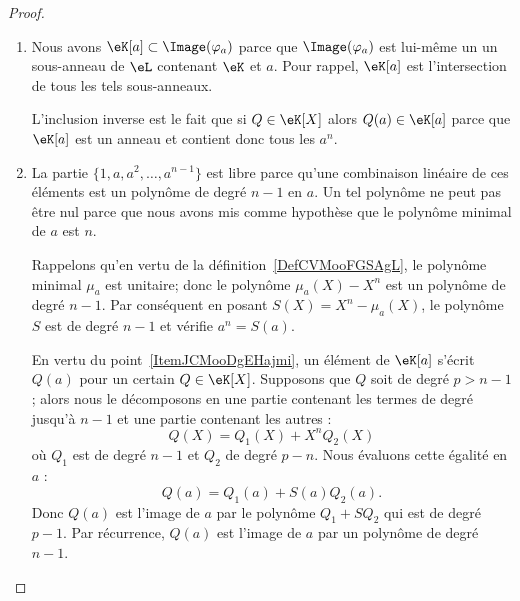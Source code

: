 \begin{proof}
    \begin{enumerate}
        \item
            Nous avons \( \eK[a]\subset \Image(\varphi_a)\) parce que \( \Image(\varphi_a)\) est lui-même un un sous-anneau de \( \eL\) contenant \( \eK\) et \( a\). Pour rappel, \( \eK[a]\) est l'intersection de tous les tels sous-anneaux.

            L'inclusion inverse est le fait que si \( Q\in \eK[X]\) alors \( Q(a)\in \eK[a]\) parce que \( \eK[a]\) est un anneau et contient donc tous les \( a^n\).
        \item
            La partie \( \{ 1,a,a^2,\ldots, a^{n-1} \}\) est libre parce qu'une combinaison linéaire de ces éléments est un polynôme de degré \( n-1\) en \( a\). Un tel polynôme ne peut pas être nul parce que nous avons mis comme hypothèse que le polynôme minimal de \( a\) est \( n\).

            Rappelons qu'en vertu de la définition~\ref{DefCVMooFGSAgL}, le polynôme minimal \( \mu_a\) est unitaire; donc le polynôme \( \mu_a(X)-X^n\) est un polynôme de degré \( n-1\). Par conséquent en posant \( S(X)=X^n-\mu_a(X)\), le polynôme \( S\) est de degré \( n-1\) et vérifie \( a^n=S(a)\).

            En vertu du point~\ref{ItemJCMooDgEHajmi}, un élément de \( \eK[a]\) s'écrit \( Q(a)\) pour un certain \( Q\in\eK[X]\). Supposons que \( Q\) soit de degré \( p>n-1\); alors nous le décomposons en une partie contenant les termes de degré jusqu'à \( n-1\) et une partie contenant les autres :
            \begin{equation}
                Q(X)=Q_1(X)+X^nQ_2(X)
            \end{equation}
            où \( Q_1\) est de degré \( n-1\) et \( Q_2\) de degré \( p-n\). Nous évaluons cette égalité en \( a\) :
            \begin{equation}
                Q(a)=Q_1(a)+S(a)Q_2(a).
            \end{equation}
            Donc \( Q(a)\) est l'image de \( a\) par le polynôme \( Q_1+SQ_2\) qui est de degré \( p-1\). Par récurrence, \( Q(a)\) est l'image de \( a\) par un polynôme de degré \( n-1\).


\end{enumerate}
\end{proof}
